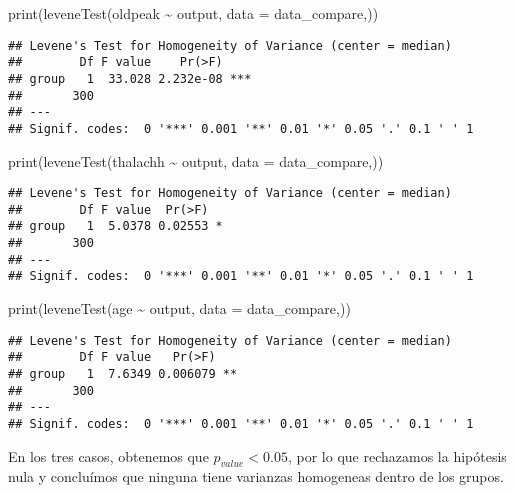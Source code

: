 \documentclass[
]{article}
\newenvironment{Shaded}{\begin{snugshade}}{\end{snugshade}}
\newcommand{\AttributeTok}[1]{\textcolor[rgb]{0.77,0.63,0.00}{#1}}
\newcommand{\FunctionTok}[1]{\textcolor[rgb]{0.00,0.00,0.00}{#1}}
\newcommand{\NormalTok}[1]{#1}
\newcommand{\SpecialCharTok}[1]{\textcolor[rgb]{0.00,0.00,0.00}{#1}}
\begin{document}
\begin{Shaded}
\begin{Highlighting}[]
\FunctionTok{print}\NormalTok{(}\FunctionTok{leveneTest}\NormalTok{(oldpeak }\SpecialCharTok{\textasciitilde{}}\NormalTok{ output, }\AttributeTok{data =}\NormalTok{ data\_compare,))}
\end{Highlighting}
\end{Shaded}

\begin{verbatim}
## Levene's Test for Homogeneity of Variance (center = median)
##        Df F value    Pr(>F)    
## group   1  33.028 2.232e-08 ***
##       300                      
## ---
## Signif. codes:  0 '***' 0.001 '**' 0.01 '*' 0.05 '.' 0.1 ' ' 1
\end{verbatim}

\begin{Shaded}
\begin{Highlighting}[]
\FunctionTok{print}\NormalTok{(}\FunctionTok{leveneTest}\NormalTok{(thalachh }\SpecialCharTok{\textasciitilde{}}\NormalTok{ output, }\AttributeTok{data =}\NormalTok{ data\_compare,))}
\end{Highlighting}
\end{Shaded}

\begin{verbatim}
## Levene's Test for Homogeneity of Variance (center = median)
##        Df F value  Pr(>F)  
## group   1  5.0378 0.02553 *
##       300                  
## ---
## Signif. codes:  0 '***' 0.001 '**' 0.01 '*' 0.05 '.' 0.1 ' ' 1
\end{verbatim}

\begin{Shaded}
\begin{Highlighting}[]
\FunctionTok{print}\NormalTok{(}\FunctionTok{leveneTest}\NormalTok{(age }\SpecialCharTok{\textasciitilde{}}\NormalTok{ output, }\AttributeTok{data =}\NormalTok{ data\_compare,))}
\end{Highlighting}
\end{Shaded}

\begin{verbatim}
## Levene's Test for Homogeneity of Variance (center = median)
##        Df F value   Pr(>F)   
## group   1  7.6349 0.006079 **
##       300                    
## ---
## Signif. codes:  0 '***' 0.001 '**' 0.01 '*' 0.05 '.' 0.1 ' ' 1
\end{verbatim}

En los tres casos, obtenemos que \(p_{value} < 0.05\), por lo que
rechazamos la hipótesis nula y concluímos que ninguna tiene varianzas
homogeneas dentro de los grupos.
\end{document}
